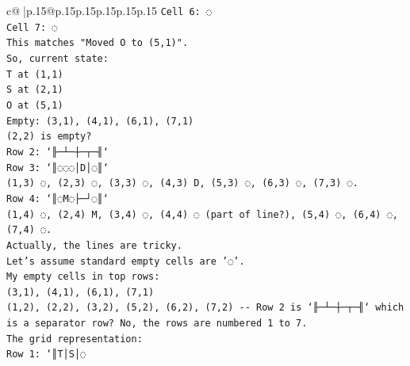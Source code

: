 \documentclass{article}
\begin{document}
{\begin{supertabular}{c@{$\;$}|p{.15\linewidth}@{}p{.15\linewidth}p{.15\linewidth}p{.15\linewidth}p{.15\linewidth}p{.15\linewidth}}
{{{\texttt{Cell 6: ◌} \\
\texttt{Cell 7: ◌} \\
\texttt{This matches "Moved O to (5,1)".} \\
\texttt{So, current state:} \\
\texttt{T at (1,1)} \\
\texttt{S at (2,1)} \\
\texttt{O at (5,1)} \\
\texttt{Empty: (3,1), (4,1), (6,1), (7,1)} \\
\texttt{(2,2) is empty?} \\
\texttt{Row 2: `╟─┴─┼─┬─╢`} \\
\texttt{Row 3: `║◌◌◌│D│◌║`} \\
\texttt{(1,3) ◌, (2,3) ◌, (3,3) ◌, (4,3) D, (5,3) ◌, (6,3) ◌, (7,3) ◌.} \\
\texttt{Row 4: `║◌M◌├─┘◌║`} \\
\texttt{(1,4) ◌, (2,4) M, (3,4) ◌, (4,4) ◌ (part of line?), (5,4) ◌, (6,4) ◌, (7,4) ◌.} \\
\texttt{Actually, the lines are tricky.} \\
\texttt{Let's assume standard empty cells are '◌'.} \\
\texttt{My empty cells in top rows:} \\
\texttt{(3,1), (4,1), (6,1), (7,1)} \\
\texttt{(1,2), (2,2), (3,2), (5,2), (6,2), (7,2) {-}{-} Row 2 is `╟─┴─┼─┬─╢` which is a separator row? No, the rows are numbered 1 to 7.} \\
\texttt{The grid representation:} \\
\texttt{Row 1: `║T│S│◌} \\
            }
        }
    }
     \\ \\


\end{supertabular}}
\end{document}
